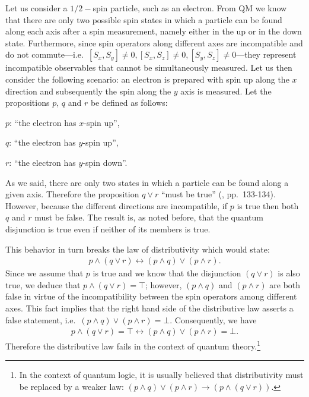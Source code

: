 \documentclass[11pt, executivepaper]{article}
\begin{document}
Let us consider a $1/2-$spin particle, such as an electron. From QM we know that there are only two possible spin states in which a particle can be found along each axis after a spin measurement, namely either in the up or in the down state. Furthermore, since spin operators along different axes are incompatible and do not commute---i.e.\ $[S_x, S_y]\neq 0, [S_x, S_z]\neq 0, [S_y, S_z]\neq0$---they represent incompatible observables that cannot be simultaneously measured. Let us then consider the following scenario: an electron is prepared with spin up along the $x$ direction and subsequently the spin along the $y$ axis is measured. Let the propositions $p$, $q$ and $r$ be defined as follows:
\begin{description}
	\item $p$: ``the electron has $x$-spin up'', 
	\item $q$: ``the electron has $y$-spin up'',
	\item $r$: ``the electron has $y$-spin down''.
\end{description}
As we said, there are only two states in which a particle can be found along a given axis. Therefore the proposition $q \vee r$ ``must be true'' (\cite{Giuntini:2002}, pp.\ 133-134). However, because the different directions are incompatible, if $p$ is true then both $q$ and $r$ must be false. The result is, as noted before, that the quantum disjunction is true even if neither of its members is true.

This behavior in turn breaks the law of distributivity which would state:
\begin{align}
	\label{DL}
	p\wedge(q\vee r)\longleftrightarrow(p\wedge q)\vee(p\wedge r).
\end{align}
\noindent Since we assume that $p$ is true and we know that the disjunction $(q\vee r)$ is also true, we deduce that $p\wedge(q\vee r)=\top$; however, $(p\wedge q)$ and $(p\wedge r)$ are both false in virtue of the incompatibility between the spin operators among different axes. This fact implies that the right hand side of the distributive law asserts a false statement, i.e.\ $(p\wedge q)\vee(p\wedge r)=\bot$. Consequently, we have 
\begin{align}
	\label{contradiction}
	p\wedge(q\vee r)=\top\longleftrightarrow(p\wedge q)\vee(p\wedge r)=\bot. 
\end{align}
Therefore the distributive law fails in the context of quantum theory.\footnote{In the context of quantum logic, it is usually believed that distributivity must be replaced by a weaker law: $(p\wedge q)\vee(p\wedge r)\longrightarrow(p\wedge(q\vee r)).$}
\end{document}
